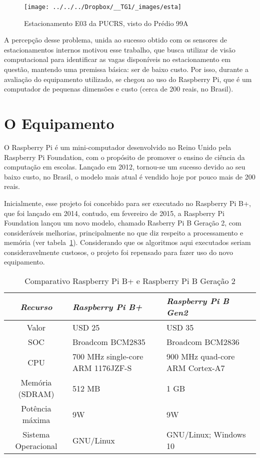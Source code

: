 \documentclass[ecp,tc]{iiufrgs}
\begin{document}
\begin{figure}
	\centering
	\caption{Estacionamento E03 da PUCRS, visto do Prédio 99A}
	\texttt{[image: ../../../Dropbox/\_\_TG1/\_images/esta]}
	\label{fig:esta}
\end{figure}

A percepção desse problema, unida ao sucesso obtido com os sensores de estacionamentos internos motivou esse trabalho, que busca utilizar de visão computacional para identificar as vagas disponíveis no estacionamento em questão, mantendo uma premissa básica: ser de baixo custo. Por isso, durante a avaliação do equipamento utilizado, se chegou ao uso do Raspberry Pi, que é um computador de pequenas dimensões e custo (cerca de 200 reais, no Brasil). 

\section{O Equipamento}

O Raspberry Pi é um mini-computador desenvolvido no Reino Unido pela Raspberry Pi Foundation, com o propósito de promover o ensino de ciência da computação em escolas. Lançado em 2012, tornou-se um sucesso devido ao seu baixo custo, no Brasil, o modelo mais atual é vendido hoje por pouco mais de 200 reais.

Inicialmente, esse projeto foi concebido para ser executado no Raspberry Pi B+, que foi lançado em 2014, contudo, em fevereiro de 2015, a Raspberry Pi Foundation lançou um novo modelo, chamado Rasberry Pi B Geração 2, com consideráveis melhorias, principalmente no que diz respeito a processamento e memória (ver tabela~\ref{tbl:rpi}). Considerando que os algoritmos aqui executados seriam consideravelmente custosos, o projeto foi repensado para fazer uso do novo equipamento.

\begin{table}
	\caption{Comparativo Raspberry Pi B+ e Raspberry Pi B Geração 2}
	\begin{center}
		\begin{tabular}{c|p{5cm}|p{5cm}}
			\textit{Recurso}  &   \textit{Raspberry Pi B+}  &   \textit{Raspberry Pi B Gen2} \\
			\hline
			\hline
			Valor & USD 25 & USD 35 \\
			\hline
			SOC & Broadcom BCM2835  & Broadcom BCM2836 \\
			\hline
			CPU & 700 MHz single-core ARM 1176JZF-S & 900 MHz quad-core ARM Cortex-A7 \\
			\hline
			Memória (SDRAM) & 512 MB & 1 GB \\
			\hline
			Potência máxima & 9W & 9W \\
			\hline
			Sistema Operacional & GNU/Linux & GNU/Linux; Windows 10 \\
			\hline
		\end{tabular}
	\end{center}
	\label{tbl:rpi}
\end{table}
\end{document}
